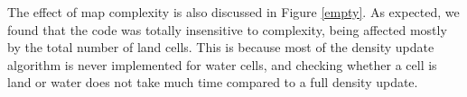   \newpage{}
  
  
  The effect of map complexity is also discussed in Figure \ref{empty}. As expected, we found that the code was totally insensitive to
  complexity, being affected mostly by the total number of land cells. This is because most of the density update algorithm is never implemented for water 
  cells, and checking whether a cell is land or water does not take much time compared to a full density update.
  
  
